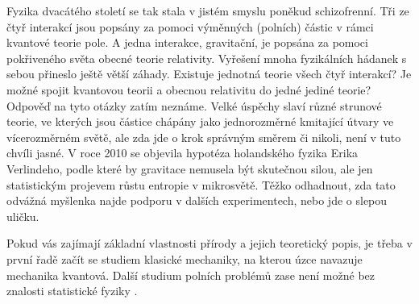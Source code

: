     Fyzika dvacátého století se tak stala v jistém smyslu poněkud schizofrenní. Tři ze čtyř
    interakcí jsou popsány za pomoci výměnných (polních) částic v rámci kvantové teorie pole. A
    jedna interakce, gravitační, je popsána za pomoci pokřiveného světa obecné teorie relativity.
    Vyřešení mnoha fyzikálních hádanek s sebou přineslo ještě větší záhady. Existuje jednotná teorie
    všech čtyř interakcí? Je možné spojit kvantovou teorii a obecnou relativitu do jedné jediné
    teorie? Odpověď na tyto otázky zatím neznáme. Velké úspěchy slaví různé strunové teorie, ve
    kterých jsou částice chápány jako jednorozměrné kmitající útvary ve vícerozměrném světě, ale zda
    jde o krok správným směrem či nikoli, není v tuto chvíli jasné. V roce 2010 se objevila hypotéza
    holandského fyzika Erika Verlindeho, podle které by gravitace nemusela být skutečnou silou, ale
    jen statistickým projevem růstu entropie v mikrosvětě. Těžko odhadnout, zda tato odvážná
    myšlenka najde podporu v dalších experimentech, nebo jde o slepou uličku.
    
    Pokud vás zajímají základní vlastnosti přírody a jejich teoretický popis, je třeba v první řadě
    začít se studiem klasické mechaniky, na kterou úzce navazuje mechanika kvantová. Další studium
    polních problémů zase není možné bez znalosti statistické fyziky \cite[s.~14]{Kulhanek2019}. 